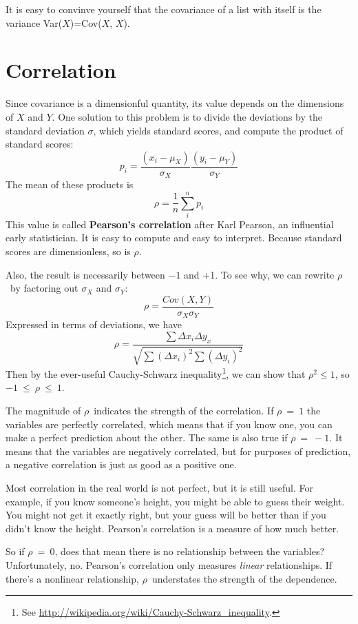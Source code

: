 It is easy to convinve yourself that the covariance of a list with itself is the variance
Var($X$)=Cov($X$, $X$).


\section{Correlation}

Since covariance is a dimensionful quantity, its value depends on the dimensions of $X$ and $Y$. 
One solution to this problem is to divide the deviations by the standard deviation $\sigma$,
which yields standard scores, and compute the product of standard scores:
%
\[ p_i = \frac{(x_i - \mu_X)}{\sigma_X} \frac{(y_i - \mu_Y)}{\sigma_Y} \]
%
The mean of these products is
%
\[ \rho = \frac{1}{n} \sum_i^n p_i \]
%
This value is called \textbf{Pearson's correlation} after Karl Pearson,
an influential early statistician.  It is easy to compute and easy to
interpret.  Because standard scores are dimensionless, so is $\rho$.

Also, the result is necessarily between $-1$ and +1.  To see why, we
can rewrite $\rho$~by factoring out $\sigma_{X}$ and $\sigma_Y$:
%
\[ \rho = \frac{Cov(X,Y)}{\sigma_X \sigma_Y} \]
%
Expressed in terms of deviations, we have
%
\[ \rho = \frac{\sum \Delta x_i \Delta y_x}{\sqrt{\sum (\Delta x_i)^2 \sum (\Delta y_i)^2}} \]
%
Then by the ever-useful Cauchy-Schwarz inequality\footnote{See
  \url{http://wikipedia.org/wiki/Cauchy-Schwarz_inequality}.}, we can show
that $\rho^{2} \le 1$, so $-1~\le~\rho~\le~1$.

The magnitude of $\rho$~indicates the strength of the correlation.  If
$\rho~=~1$ the variables are perfectly correlated, which means that if
you know one, you can make a perfect prediction about the other.  The
same is also true if $\rho~=~-1$.  It means that the variables
are negatively correlated, but for purposes of prediction, a
negative correlation is just as good as a positive one.

Most correlation in the real world is not perfect, but it
is still useful.  For example, if you know someone's height, you might
be able to guess their weight.  You might not get it exactly right, but
your guess will be better than if you didn't know the height.
Pearson's correlation is a measure of how much better.

So if $\rho~=~0$, does that mean there is no
relationship between the variables?  Unfortunately, no.  Pearson's
correlation only measures {\em linear} relationships.  If there's a
nonlinear relationship, $\rho$~understates the strength of the
dependence.

